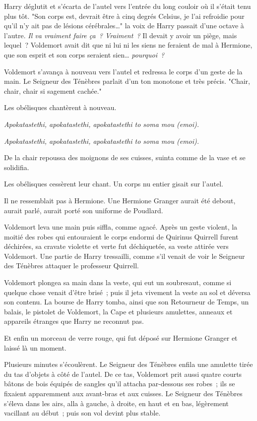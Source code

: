 Harry déglutit et s'écarta de l'autel vers l'entrée du long couloir où il s'était tenu plus tôt. "Son corps est, devrait être à cinq degrés Celsius, je l'ai refroidie pour qu'il n'y ait pas de lésions cérébrales…" la voix de Harry passait d'une octave à l'autre. \emph{Il va vraiment faire ça~? Vraiment~?} Il devait y avoir un piège, mais lequel~? Voldemort avait dit que ni lui ni les siens ne feraient de mal à Hermione, que son esprit et son corps seraient sien… \emph{pourquoi~?}

Voldemort s'avança à nouveau vers l'autel et redressa le corps d'un geste de la main. Le Seigneur des Ténèbres parlait d'un ton monotone et très précis. "Chair, chair, chair si sagement cachée."

Les obélisques chantèrent à nouveau.

\emph{Apokatastethi, apokatastethi, apokatastethi to soma mou (emoi).}

\emph{Apokatastethi, apokatastethi, apokatastethi to soma mou (emoi).}

De la chair repoussa des moignons de ses cuisses, suinta comme de la vase et se solidifia.

Les obélisques cessèrent leur chant. Un corps nu entier gisait sur l'autel.

Il ne ressemblait pas à Hermione. Une Hermione Granger aurait été debout, aurait parlé, aurait porté son uniforme de Poudlard.

Voldemort leva une main puis siffla, comme agacé. Après un geste violent, la moitié des robes qui entouraient le corps endormi de Quirinus Quirrell furent déchirées, sa cravate violette et verte fut déchiquetée, sa veste attirée vers Voldemort. Une partie de Harry tressailli, comme s'il venait de voir le Seigneur des Ténèbres attaquer le professeur Quirrell.

Voldemort plongea sa main dans la veste, qui eut un soubresaut, comme si quelque chose venait d'être brisé~; puis il jeta vivement la veste au sol et déversa son contenu. La bourse de Harry tomba, ainsi que son Retourneur de Temps, un balais, le pistolet de Voldemort, la Cape et plusieurs amulettes, anneaux et appareils étranges que Harry ne reconnut pas.

Et enfin un morceau de verre rouge, qui fut déposé sur Hermione Granger et laissé là un moment.

Plusieurs minutes s'écoulèrent. Le Seigneur des Ténèbres enfila une amulette tirée du tas d'objets à côté de l'autel. De ce tas, Voldemort prit aussi quatre courts bâtons de bois équipés de sangles qu'il attacha par-dessous ses robes~; ils se fixaient apparemment aux avant-bras et aux cuisses. Le Seigneur des Ténèbres s'éleva dans les airs, alla à gauche, à droite, en haut et en bas, légèrement vacillant au début~; puis son vol devint plus stable.

